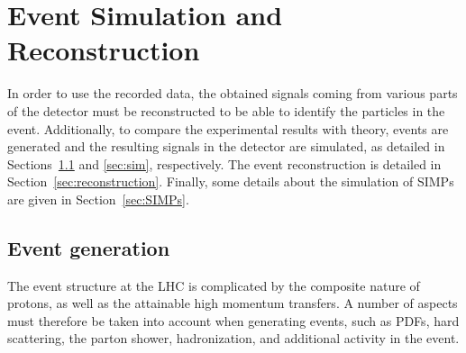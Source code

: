 \graphicspath{{chapt_dutch/}{intro/}{detector/}{reconstruction/}}

\renewcommand\evenpagerightmark{{\scshape\small Chapter 4}}
\renewcommand\oddpageleftmark{{\scshape\small Event Simulation and Reconstruction}}

\hyphenation{}

\chapter{Event Simulation and Reconstruction}
\label{ch4}

In order to use the recorded data, the obtained signals coming from various parts of the detector must be reconstructed to be able to identify the particles in the event. Additionally, to compare the experimental results with theory, events are generated and the resulting signals in the detector are simulated, as detailed in Sections~\ref{sec:generation} and \ref{sec:sim}, respectively. The event reconstruction is detailed in Section~\ref{sec:reconstruction}. Finally, some details about the simulation of \acp{SIMP} are given in Section~\ref{sec:SIMPs}.

\section{Event generation}
\label{sec:generation}


The event structure at the \ac{LHC} is complicated by the composite nature of protons, as well as the attainable high momentum transfers. A number of aspects must therefore be taken into account when generating events, such as \acp{PDF}, hard scattering, the parton shower, hadronization, and additional activity in the event.

